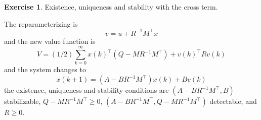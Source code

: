 \documentclass[11pt,a4paper]{report}
\theoremstyle{definition}\newtheorem{exercise}{Exercise}[chapter]
\begin{document}
\begin{exercise}Existence, uniqueness and stability with the cross term.\\
\end{exercise}
\begin{answer}
The reparameterizing is
\begin{equation}
    v=u+R^{-1}M^\top x
\end{equation}
and the new value function is 
\begin{equation}
    V=(1/2)\sum_{k=0}^\infty x(k)^\top(Q-MR^{-1}M^\top)+v(k)^\top R v(k)
\end{equation}
and the system changes to
\begin{equation}
    x(k+1)=(A-BR^{-1}M^\top)x(k)+Bv(k)
\end{equation}
the existence, uniqueness and stability conditions are $(A-BR^{-1}M^\top,B)$ stabilizable, $Q-MR^{-1}M^\top\ge 0$, $(A-BR^{-1}M^\top, Q-MR^{-1}M^\top)$ detectable, and $R\ge 0$.
\end{answer}
\end{document}
